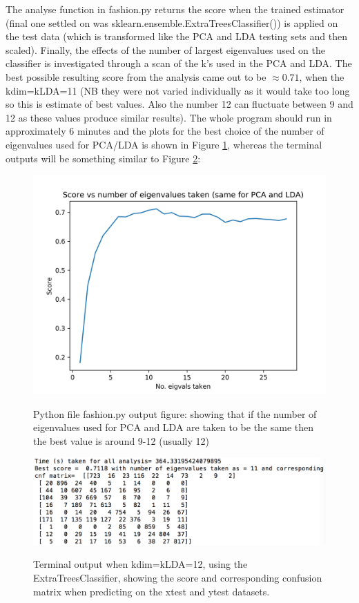 \documentclass[11pt, oneside]{article}   	%
\begin{document}
The analyse function in fashion.py returns the score when the trained estimator (final one settled on was sklearn.ensemble.ExtraTreesClassifier()) is applied on the test data (which is transformed like the PCA and LDA testing sets and then scaled). Finally, the effects of the number of largest eigenvalues used on the classifier is investigated through a scan of the k's used in the PCA and LDA. The best possible resulting score from the analysis came out to be $\approx 0.71$, when the kdim=kLDA=11 (NB they were not varied individually as it would take too long so this is estimate of best values. Also the number 12 can fluctuate between 9 and 12 as these values produce similar results). The whole program should run in approximately 6 minutes and the plots for the best choice of the number of eigenvalues used for PCA/LDA is shown in Figure \ref{fig:fig1}, whereas the terminal outputs will be something similar to Figure \ref{fig:fig2}:

\begin{figure}[H]
\centering
\includegraphics[scale=0.7]{pythonfileoutput.png}
\label{fig:fig1}
\caption{Python file fashion.py output figure: showing that if the number of eigenvalues used for PCA and LDA are taken to be the same then the best value is around 9-12 (usually 12)}
\end{figure}
\begin{figure}[H]
\centering
\includegraphics[scale=0.7]{terminaloutput.png}
\label{fig:fig2}
\caption{Terminal output when kdim=kLDA=12, using the ExtraTreesClassifier, showing the score and corresponding confusion matrix when predicting on the xtest and ytest datasets.}
\end{figure}
\end{document}
